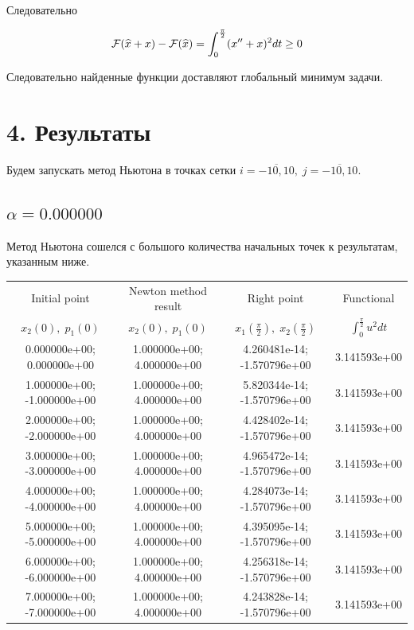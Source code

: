 \documentclass[titlepage]{article}
\def\l{\left}
\def\r{\right}
\begin{document}
Следовательно

\begin{gather*}
	\notag \mathcal{F}(\widehat{x} + x) - \mathcal{F}(\widehat{x}) = \int_{0}^{\frac{\pi}{2}}(x'' + x)^2 dt\geq 0\\	
\end{gather*}

Следовательно найденные функции доставляют глобальный минимум задачи.


\section{4. Результаты}

Будем запускать метод Ньютона в точках сетки $i=\overline{-10,10}, \; j=\overline{-10,10}$.

\subsection{$\alpha = 0.000000$} 
Метод Ньютона сошелся с большого количества начальных точек к результатам, указанным ниже. \\ 
\begin{tabular}{ | c | c | c | c |} 
\hline 
Initial point  & Newton method result & Right point & Functional 
 \\ $x_2(0), \; p_1(0)$ & $x_2(0), \; p_1(0)$ & $x_1\l(\frac{\pi}{2}\r), \; x_2\l(\frac{\pi}{2}\r)$ & $\int_{0}^{\frac{\pi}{2}}u^2dt$  \\ \hline 
0.000000e+00; 0.000000e+00 & 1.000000e+00; 4.000000e+00 & 4.260481e-14; -1.570796e+00 & 3.141593e+00 \\ \hline 
1.000000e+00; -1.000000e+00 & 1.000000e+00; 4.000000e+00 & 5.820344e-14; -1.570796e+00 & 3.141593e+00 \\ \hline 
2.000000e+00; -2.000000e+00 & 1.000000e+00; 4.000000e+00 & 4.428402e-14; -1.570796e+00 & 3.141593e+00 \\ \hline 
3.000000e+00; -3.000000e+00 & 1.000000e+00; 4.000000e+00 & 4.965472e-14; -1.570796e+00 & 3.141593e+00 \\ \hline 
4.000000e+00; -4.000000e+00 & 1.000000e+00; 4.000000e+00 & 4.284073e-14; -1.570796e+00 & 3.141593e+00 \\ \hline 
5.000000e+00; -5.000000e+00 & 1.000000e+00; 4.000000e+00 & 4.395095e-14; -1.570796e+00 & 3.141593e+00 \\ \hline 
6.000000e+00; -6.000000e+00 & 1.000000e+00; 4.000000e+00 & 4.256318e-14; -1.570796e+00 & 3.141593e+00 \\ \hline 
7.000000e+00; -7.000000e+00 & 1.000000e+00; 4.000000e+00 & 4.243828e-14; -1.570796e+00 & 3.141593e+00 \\ \hline 
\end{tabular} 
\end{document}

